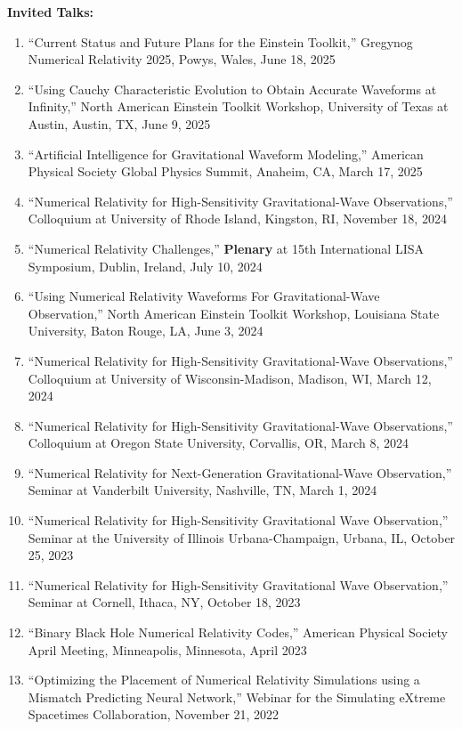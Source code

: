 \documentclass[11pt]{article}
\begin{document}
\begin{flushleft}
  \vspace{8px}

\textbf{Invited Talks:}
  \begin{enumerate}
  \item ``Current Status and Future Plans for the Einstein Toolkit,'' Gregynog Numerical Relativity 2025, Powys, Wales, June 18, 2025
  \item ``Using Cauchy Characteristic Evolution to Obtain Accurate Waveforms at Infinity,'' North American Einstein Toolkit Workshop, University of Texas at Austin, Austin, TX, June 9, 2025
  \item ``Artificial Intelligence for Gravitational Waveform Modeling,'' American Physical Society Global Physics Summit, Anaheim, CA, March 17, 2025
  \item ``Numerical Relativity for High-Sensitivity Gravitational-Wave Observations,'' Colloquium at University of Rhode Island, Kingston, RI, November 18, 2024 
  \item ``Numerical Relativity Challenges,'' \textbf{Plenary} at 15th International LISA Symposium, Dublin, Ireland, July 10, 2024
  \item ``Using Numerical Relativity Waveforms For Gravitational-Wave Observation,'' North American Einstein Toolkit Workshop, Louisiana State University, Baton Rouge, LA, June 3, 2024
  \item ``Numerical Relativity for High-Sensitivity Gravitational-Wave Observations,'' Colloquium at University of Wisconsin-Madison, Madison, WI, March 12, 2024 
  \item ``Numerical Relativity for High-Sensitivity Gravitational-Wave Observations,'' Colloquium at Oregon State University, Corvallis, OR, March 8, 2024 
  \item ``Numerical Relativity for Next-Generation Gravitational-Wave Observation,'' Seminar at Vanderbilt University, Nashville, TN, March 1, 2024
  \item ``Numerical Relativity for High-Sensitivity Gravitational Wave Observation,'' Seminar at the University of Illinois Urbana-Champaign, Urbana, IL, October 25, 2023
  \item ``Numerical Relativity for High-Sensitivity Gravitational Wave Observation,'' Seminar at Cornell, Ithaca, NY, October 18, 2023
  \item ``Binary Black Hole Numerical Relativity Codes,'' American Physical Society April Meeting, Minneapolis, Minnesota, April 2023
  \item ``Optimizing the Placement of Numerical Relativity Simulations using a Mismatch Predicting Neural Network,''  Webinar for the Simulating eXtreme Spacetimes Collaboration,  November 21, 2022

\end{enumerate}
\end{flushleft}
\end{document}
